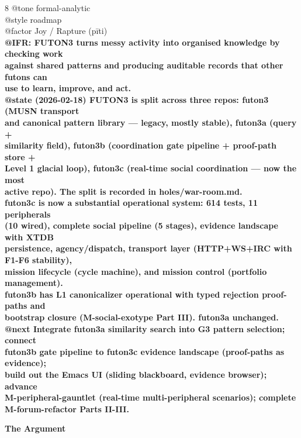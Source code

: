\documentclass[landscape]{article}
\begin{document}
\begin{paracol}{8}
@tone formal-analytic\\
@style roadmap\\
@factor Joy / Rapture (pīti)\\
\textbf{@IFR: FUTON3 turns messy activity into organised knowledge by checking work}\\
\textbf{against shared patterns and producing auditable records that other futons can}\\
\textbf{use to learn, improve, and act.}\\
\textbf{@state (2026-02-18) FUTON3 is split across three repos: futon3 (MUSN transport}\\
\textbf{and canonical pattern library — legacy, mostly stable), futon3a (query +}\\
\textbf{similarity field), futon3b (coordination gate pipeline + proof-path store +}\\
\textbf{Level 1 glacial loop), futon3c (real-time social coordination — now the most}\\
\textbf{active repo). The split is recorded in holes/war-room.md.}\\
\textbf{futon3c is now a substantial operational system: 614 tests, 11 peripherals}\\
\textbf{(10 wired), complete social pipeline (5 stages), evidence landscape with XTDB}\\
\textbf{persistence, agency/dispatch, transport layer (HTTP+WS+IRC with F1-F6 stability),}\\
\textbf{mission lifecycle (cycle machine), and mission control (portfolio management).}\\
\textbf{futon3b has L1 canonicalizer operational with typed rejection proof-paths and}\\
\textbf{bootstrap closure (M-social-exotype Part III). futon3a unchanged.}\\
\textbf{@next Integrate futon3a similarity search into G3 pattern selection; connect}\\
\textbf{futon3b gate pipeline to futon3c evidence landscape (proof-paths as evidence);}\\
\textbf{build out the Emacs UI (sliding blackboard, evidence browser); advance}\\
\textbf{M-peripheral-gauntlet (real-time multi-peripheral scenarios); complete}\\
\textbf{M-forum-refactor Parts II-III.}\\
\par
\textbf{The Argument}\par

\end{paracol}
\end{document}
